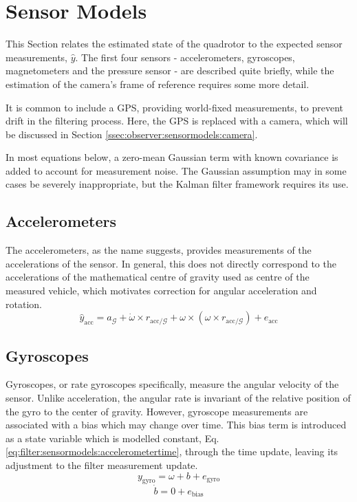 \section{Sensor Models}
\label{sec:observer:sensormodels}
    This Section relates the estimated state of the quadrotor to the expected sensor measurements, $\hat{y}$.
    The first four sensors - accelerometers, gyroscopes, magnetometers
    and the pressure sensor - are described quite briefly, while the
    estimation of the camera's frame of reference requires some more detail.

    It is common to include a GPS, providing world-fixed measurements,
    to prevent drift in the filtering process. Here, the GPS is replaced with a camera,
    which will be discussed in Section \ref{ssec:observer:sensormodels:camera}.

    In most equations below, a zero-mean Gaussian term with known covariance is added
    to account for measurement noise. The Gaussian assumption may in some
    cases be severely inappropriate, but the Kalman filter framework requires its use.

    \subsection{Accelerometers}
        The accelerometers, as the name suggests, provides measurements of the
        accelerations of the sensor. In general, this does not directly correspond
        to the accelerations of the mathematical centre of gravity used
        as centre of the measured vehicle, which motivates correction
        for angular acceleration and rotation.
        \begin{equation}
            \hat{y}_{\text{acc}} = a_{\mathcal{G}} + \dot{\omega} \times r_{\text{acc}/\mathcal{G}} + \omega \times \left( \omega \times r_{\text{acc}/\mathcal{G}} \right) + e_{\text{acc}}
        \end{equation}

    \subsection{Gyroscopes}
        Gyroscopes, or rate gyroscopes specifically, measure the angular velocity
        of the sensor. Unlike acceleration, the angular rate is invariant of the
        relative position of the gyro to the center of gravity.
        However, gyroscope measurements are associated with a bias which may
        change over time. This bias term is introduced as a state variable which
        is modelled constant, Eq. \eqref{eq:filter:sensormodels:accelerometertime},
        through the time update, leaving its adjustment to the filter measurement update.
        \begin{equation}
            y_{\text{gyro}} = \omega + b + e_{\text{gyro}}
        \end{equation}
        \begin{equation}
            \label{eq:filter:sensormodels:accelerometertime}
            \dot{b} = 0 + e_{\text{bias}}
        \end{equation}

